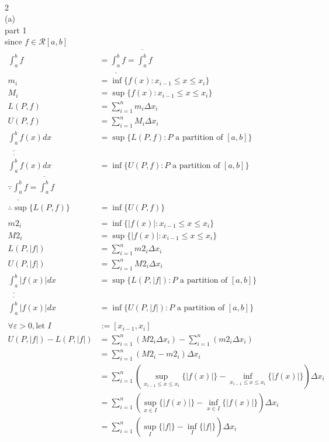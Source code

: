 \documentclass[12pt, border = 4pt, multi]{article} %
\begin{document}
\\
2\\
(a)\\
part 1\\
since $f \in \mathscr{R}[a, b]$
\begin{align*}
\int_a ^ b f &= \underline{\int_a ^ b} f = \overline{\int_a ^ b} f\\
m_i &= \inf\{f(x): x_{i - 1} \leq x \leq x_i\}\\
M_i &= \sup\{f(x): x_{i - 1} \leq x \leq x_i\}\\
L(P, f) &= \sum_{i = 1} ^ n m_i \Delta x_i\\
U(P, f) &= \sum_{i = 1} ^ n M_i \Delta x_i\\
\underline{\int_a ^ b}f(x)dx &= \sup\{L(P, f): P \text{ a partition of }[a, b]\}\\
\overline{\int_a ^ b}f(x)dx &= \inf\{U(P, f): P \text{ a partition of }[a, b]\}\\
\because \underline{\int_a ^ b} f = \overline{\int_a ^ b} f\\
\therefore \sup\{L(P, f)\} &= \inf\{U(P, f)\}\\
\\
m2_i &= \inf\{|f(x)|: x_{i - 1} \leq x \leq x_i\}\\
M2_i &= \sup\{|f(x)|: x_{i - 1} \leq x \leq x_i\}\\
L(P, |f|) &= \sum_{i = 1} ^ n m2_i \Delta x_i\\
U(P, |f|) &= \sum_{i = 1} ^ n M2_i \Delta x_i \\
\underline{\int_a ^ b}|f(x)|dx &= \sup\{L(P, |f|): P \text{ a partition of }[a, b]\}\\
\overline{\int_a ^ b}|f(x)|dx &= \inf\{U(P, |f|): P \text{ a partition of }[a, b]\}\\
\\
\forall \varepsilon > 0, \text{let } I &:= [x_{i - 1}, x_i]\\
U(P, |f|) - L(P, |f|) &= \sum_{i = 1} ^ n (M2_i \Delta x_i) - \sum_{i = 1} ^ n (m2_i \Delta x_i)\\
&= \sum_{i = 1} ^ n (M2_i - m2_i) \Delta x_i\\
&= \sum_{i = 1} ^ n\left(\sup_{x_{i - 1} \leq x \leq x_i}\{|f(x)|\} - \inf_{x_{i - 1} \leq x \leq x_i}\{|f(x)|\}\right)\Delta x_i\\
&= \sum_{i = 1} ^ n\left(\sup_{x \in I}\{|f(x)|\} - \inf_{x \in I}\{|f(x)|\}\right)\Delta x_i\\
&= \sum_{i = 1} ^ n\left(\sup_I\{|f|\} - \inf_I\{|f|\}\right)\Delta x_i\\

\end{align*}
\end{document}
